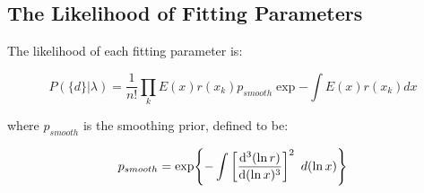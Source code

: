 \subsection{The Likelihood of Fitting Parameters}
\label{subsec:likelihood}

The likelihood of each fitting parameter is:

\begin{equation}
\label{likelihood}
P(\{d\}|\lambda) = \frac{1}{n!}\prod_{k} E(x)r(x_k) p_{smooth}\exp{-\int E(x)r(x_k)dx}
\end{equation}

where $p_{smooth}$ is the smoothing prior, defined to be:

\begin{equation}
\label{smoothing_prior}
p_{smooth} = \exp{-\int \bigg[\dv[3]{(\ln{r})}{(\ln{x})}\bigg]^2 \hspace{5pt} d{(\ln{x})}}
\end{equation}

